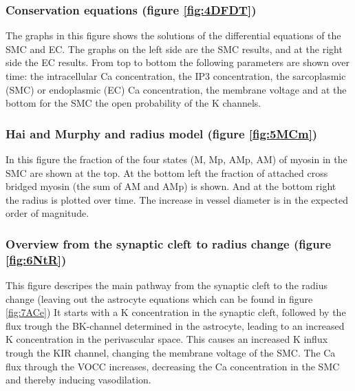 	\subsubsection*{Conservation equations (figure \ref{fig:4DFDT})}
	The graphs in this figure shows the solutions of the differential equations of the \gls{SMC} and \gls{EC}. The graphs on the left side are the SMC results, and at the right side the EC results. From top to bottom the following parameters are shown over time: the intracellular \gls{Ca} concentration, the \gls{IP3} concentration, the sarcoplasmic (\gls{SMC}) or endoplasmic (\gls{EC}) \gls{Ca} concentration, the membrane voltage and at the bottom for the SMC the open probability of the \gls{K} channels.
	
	\subsubsection*{Hai and Murphy and radius model (figure \ref{fig:5MCm})}
	In this figure the fraction of the four states (M, Mp, AMp, AM) of myosin in the SMC are shown at the top. At the bottom left the fraction of attached cross bridged myosin (the sum of AM and AMp) is shown. And at the bottom right the radius is plotted over time. The increase in vessel diameter is in the expected order of magnitude.
	
	\subsubsection*{Overview from the synaptic cleft to radius change (figure \ref{fig:6NtR})}
	This figure descripes the main pathway from the synaptic cleft to the radius change (leaving out the astrocyte equations which can be found in figure \ref{fig:7ACe}) It starts with a \gls{K} concentration in the synaptic cleft, followed by the flux trough the BK-channel determined in the astrocyte, leading to an increased \gls{K} concentration in the perivascular space. This causes an increased  \gls{K} influx trough the KIR channel, changing the membrane voltage of the SMC. The \gls{Ca} flux through the VOCC increases, decreasing the \gls{Ca} concentration in the SMC and thereby inducing vasodilation. 
		
